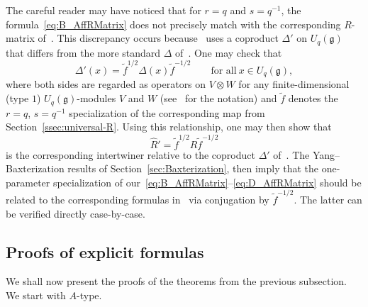 \documentclass[pdftex]{sigma}
\numberwithin{equation}{section}
\newcommand{\fg}{\mathfrak{g}}
\begin{document}
\begin{Remark}\label{remark6.14}
The careful reader may have noticed that for $r = q$ and $s = q^{-1}$, the formula~\eqref{eq:B_AffRMatrix} does not precisely match with the corresponding $R$-matrix of~\cite{Jim}. This discrepancy occurs because~\cite{Jim} uses a coproduct $\Delta'$ on $U_q(\fg)$ that differs from the more standard $\Delta$ of~\cite{J}. One may check that
\begin{displaymath}
 \Delta'(x) = \tilde{f}^{1/2}\Delta(x)\tilde{f}^{-1/2}\qquad \text{for all}\ x \in U_{q}(\fg),
\end{displaymath}
where both sides are regarded as operators on $V\otimes W$ for any finite-dimensional (type $1$) $U_{q}(\fg)$-modules $V$ and $W$ (see~\cite[Chapter~7]{J} for the notation) and $\tilde{f}$ denotes the $r = q$, $s = q^{-1}$ specialization of the corresponding map from Section~\ref{ssec:universal-R}. Using this relationship, one may then show that
\begin{displaymath}
 \hat{R}' = \tilde{f}^{1/2} \hat{R} \tilde{f}^{-1/2}
\end{displaymath}
is the corresponding intertwiner relative to the coproduct $\Delta'$ of~\cite{Jim}. The Yang--Baxterization results of Section~\ref{sec:Baxterization}, then imply that the one-parameter specialization of our~\eqref{eq:B_AffRMatrix}--\eqref{eq:D_AffRMatrix} should be related to the corresponding formulas in~\cite{Jim} via conjugation by $\tilde{f}^{-1/2}$. The latter can be verified directly case-by-case.
\end{Remark}

\subsection{Proofs of explicit formulas}

We shall now present the proofs of the theorems from the previous subsection. We start with $A$-type.
\end{document}
